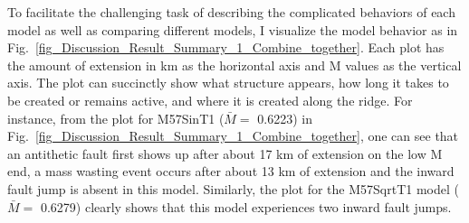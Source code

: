 
To facilitate the challenging task of describing the complicated behaviors of each model as well as comparing different models, I visualize the model behavior as in Fig.~\hyperref[fig_Discussion_Result_Summary_1_Combine_together]{\ref{fig_Discussion_Result_Summary_1_Combine_together}}. Each plot has the amount of extension in km as the horizontal axis and M values as the vertical axis. The plot can succinctly show what structure appears, how long it takes to be created or remains active, and where it is created along the ridge. 
For instance, from the plot for M57SinT1 ($\bar{M} =$ 0.6223) in Fig.~\hyperref[fig_Discussion_Result_Summary_1_Combine_together]{\ref{fig_Discussion_Result_Summary_1_Combine_together}}, one can see that an antithetic fault first shows up after about 17 km of extension on the low M end, a mass wasting event occurs after about 13 km of extension and the inward fault jump is absent in this model. Similarly, the plot for the M57SqrtT1 model ($\bar{M} =$ 0.6279) clearly shows that this model experiences two inward fault jumps. %


